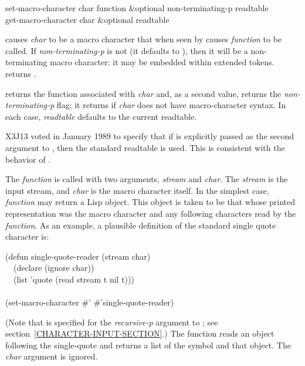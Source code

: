 \begin{defun}[Function]
set-macro-character char function &optional non-terminating-p readtable \\
get-macro-character char &optional readtable

 causes {\it char} to be a macro character that
when seen by  causes {\it function} to be called.
If {\it non-terminating-p} is not {\false} (it defaults to {\false}),
then it will be a non-terminating macro character: it may be embedded
within extended tokens.
 returns {\true}.

 returns the function associated with {\it char}
and, as a second value, returns the {\it non-terminating-p} flag; it returns
{\false} if {\it char} does not have macro-character syntax.  In each case,
{\it readtable} defaults to the current readtable.

\begin{new}
X3J13 voted in January 1989
to specify that if  is explicitly passed as the
second argument to , then the standard readtable is used.
This is consistent with the behavior of .
\end{new}

The {\it function} is called with two arguments, {\it stream}
and {\it char}.  The {\it stream} is the input stream, and {\it char} is the
macro character itself.
In the simplest case, {\it function} may return a Lisp object.
This object is taken to be that whose printed representation
was the macro character and any following characters read
by the {\it function}.
As an example, a plausible definition of the standard single quote
character is:
\begin{lisp}
(defun single-quote-reader (stream char) \\
~~(declare (ignore char)) \\
~~(list 'quote (read stream t nil t))) \\
 \\
(set-macro-character \#{\Xbackslash}' \#'single-quote-reader)
\end{lisp}
(Note that {\true} is specified for the {\it recursive-p} argument
to ; see section~\ref{CHARACTER-INPUT-SECTION}.)
The function reads an object following the single-quote and returns
a list of the symbol  and that object.
The {\it char} argument is ignored.



\end{defun}
